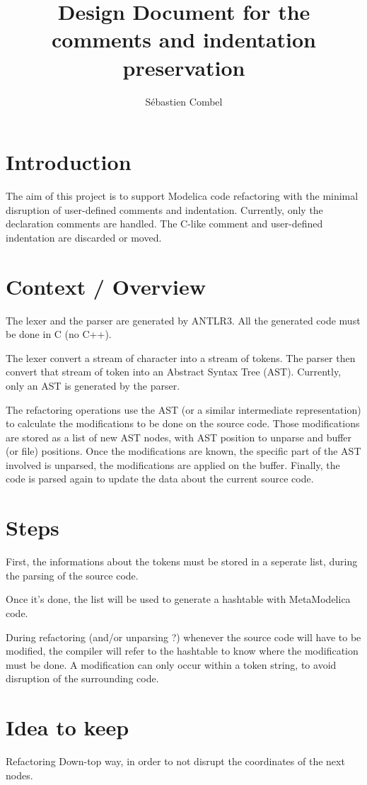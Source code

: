 \documentclass{article}
\author{Sébastien Combel}
\title{Design Document for the comments and indentation preservation}
\begin{document}
\maketitle
\tableofcontents
\newpage

\section{Introduction}
The aim of this project is to support Modelica code refactoring with the minimal disruption of user-defined comments and indentation. Currently, only the declaration comments are handled. The C-like comment and user-defined indentation are discarded or moved.

\section{Context / Overview}
The lexer and the parser are generated by ANTLR3. All the generated code must be done in C (no C++).

The lexer convert a stream of character into a stream of tokens. The parser then convert that stream of token into an Abstract Syntax Tree (AST). Currently, only an AST is generated by the parser.

The refactoring operations use the AST (or a similar intermediate representation) to calculate the modifications to be done on the source code. Those modifications are stored as a list of new AST nodes, with AST position to unparse and buffer (or file)  positions. Once the modifications are known, the specific part of the AST involved is unparsed, the modifications are applied on the buffer. Finally, the code is parsed again to update the data about the current source code.

\section{Steps}
First, the informations about the tokens must be stored in a seperate list, during the parsing of the source code.

Once it's done, the list will be used to generate a hashtable with MetaModelica code.

During refactoring (and/or unparsing ?) whenever the source code will have to be modified, the compiler will refer to the hashtable to know where the modification must be done. A modification can only occur within a token string, to avoid disruption of the surrounding code.

\section{Idea to keep}
Refactoring Down-top way, in order to not disrupt the coordinates of the next nodes.
\end{document}
